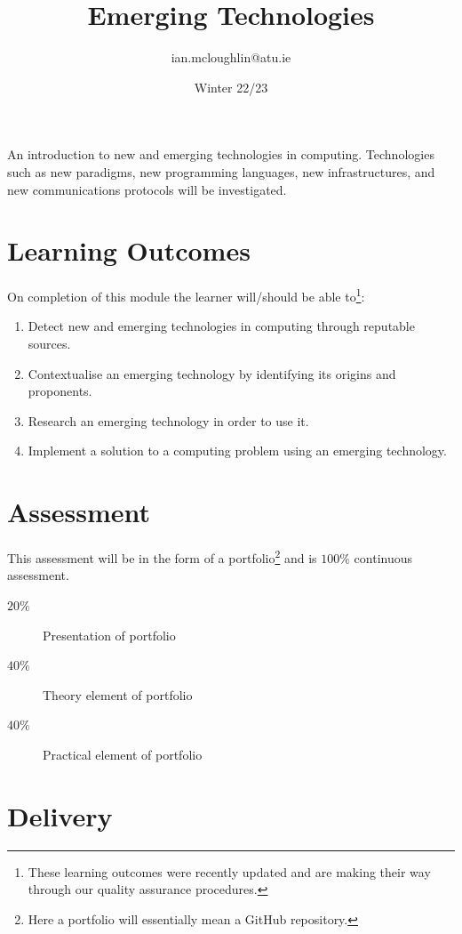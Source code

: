 \documentclass[a4paper]{tufte-handout}
\title{Emerging Technologies}
\author{ian.mcloughlin@atu.ie}
\date{Winter 22/23}
\begin{document}
 
\maketitle

An introduction to new and emerging technologies in computing.
Technologies such as new paradigms, new programming languages, new infrastructures, and new communications protocols will be investigated.


\section{Learning Outcomes}

On completion of this module the learner will/should be able to\footnote{These learning outcomes were recently updated and are making their way through our quality assurance procedures.}:

\begin{enumerate}
\item Detect new and emerging technologies in computing through reputable sources.
\item Contextualise an emerging technology by identifying its origins and proponents.
\item Research an emerging technology in order to use it.
\item Implement a solution to a computing problem using an emerging technology.
\end{enumerate}


\section{Assessment}

This assessment will be in the form of a portfolio\footnote{Here a portfolio will essentially mean a GitHub repository.} and is $100\%$ continuous assessment.

\begin{description}
  \item[$20\%$] Presentation of portfolio
  \item[$40\%$] Theory element of portfolio
  \item[$40\%$]	Practical element of portfolio
\end{description}

 
\section{Delivery}
\end{document}
